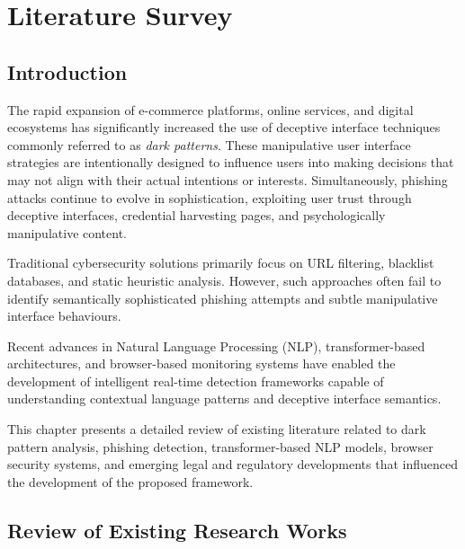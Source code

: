 
\chapter{Literature Survey}

\section{Introduction}

The rapid expansion of e-commerce platforms, online services, and digital ecosystems has significantly increased the use of deceptive interface techniques commonly referred to as \textit{dark patterns}. These manipulative user interface strategies are intentionally designed to influence users into making decisions that may not align with their actual intentions or interests. Simultaneously, phishing attacks continue to evolve in sophistication, exploiting user trust through deceptive interfaces, credential harvesting pages, and psychologically manipulative content.

Traditional cybersecurity solutions primarily focus on URL filtering, blacklist databases, and static heuristic analysis. However, such approaches often fail to identify semantically sophisticated phishing attempts and subtle manipulative interface behaviours.

Recent advances in Natural Language Processing (NLP), transformer-based architectures, and browser-based monitoring systems have enabled the development of intelligent real-time detection frameworks capable of understanding contextual language patterns and deceptive interface semantics.

This chapter presents a detailed review of existing literature related to dark pattern analysis, phishing detection, transformer-based NLP models, browser security systems, and emerging legal and regulatory developments that influenced the development of the proposed framework.


\section{Review of Existing Research Works}


